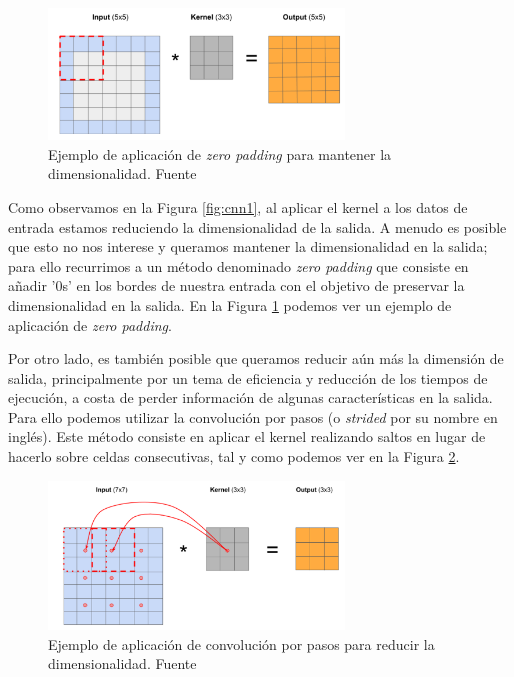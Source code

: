 \begin{figure}[!ht]
	\centering
	\includegraphics[width=0.7\textwidth]{images/arte/padding}
	\caption{Ejemplo de aplicación de \textit{zero padding} para mantener la dimensionalidad. Fuente \cite{temariodeeplearning}}
	\label{fig:padding}
\end{figure}

Como observamos en la Figura \ref{fig:cnn1}, al aplicar el kernel a los datos de  entrada estamos reduciendo la dimensionalidad de la salida. A menudo es posible que esto no nos interese y queramos mantener la dimensionalidad en la salida; para ello recurrimos a un método denominado \textit{zero padding} que consiste en añadir '0s' en los bordes de nuestra entrada con el objetivo de preservar la dimensionalidad en la salida. En la Figura \ref{fig:padding} podemos ver un ejemplo de aplicación de \textit{zero padding}.




Por otro lado, es también posible que queramos reducir aún más la dimensión de salida, principalmente por un tema de eficiencia y reducción de los tiempos de ejecución, a costa de perder información de algunas características en la salida. Para ello podemos utilizar la convolución por pasos (o \textit{strided} por su nombre en inglés). Este método consiste en aplicar el kernel realizando saltos en lugar de hacerlo sobre celdas consecutivas,  tal y como podemos ver en la Figura \ref{fig:strided}.

\begin{figure}[!ht]
	\centering
	\includegraphics[width=0.7\textwidth]{images/arte/strided}
	\caption{Ejemplo de aplicación de convolución por pasos para reducir la dimensionalidad. Fuente \cite{temariodeeplearning}}
	\label{fig:strided}
\end{figure}



